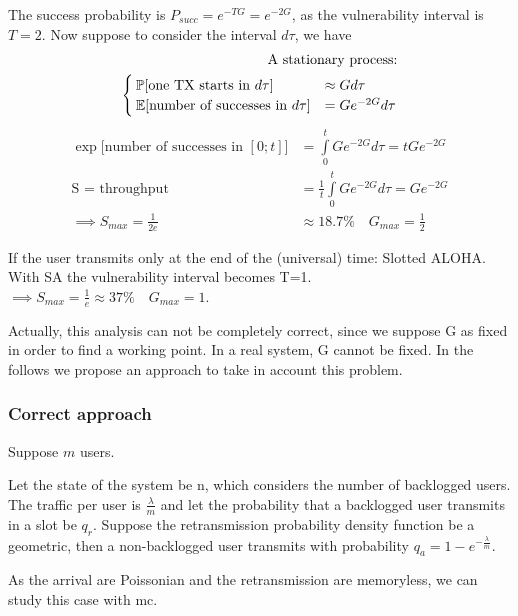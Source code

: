 The success probability is $P_{succ} = e^{-T G} = e^{-2 G}$, as the vulnerability interval is $T=2$.
Now suppose to consider the interval $d\tau$, we have
\begin{equation}\begin{split}
	\text{A stationary process:} \\
	\begin{cases}
		\mathbb{P}[\text{one TX starts in $d\tau$}] &\approx G d\tau\\
		\mathbb{E}[\text{number of successes in $d\tau$}] &= G e^{-2 G} d\tau \\
	\end{cases}
	\end{split}
	\end{equation}
	\begin{equation}\begin{split}
	\exp\bigg[\text{number of successes in $[0;t]$}\bigg] &= \int\limits_0^t G e^{-2 G}d\tau = t G e^{-2 G}\\
	\text{S = throughput }&=\frac{1}{t} \int\limits_0^t G e^{-2 G}d\tau = G e^{-2 G}\\
	\implies S_{max} = \frac{1}{2e}& \approx 18.7\% \quad G_{max} = \frac{1}{2}
\end{split}\end{equation}

If the user transmits only at the end of the (universal) time: Slotted ALOHA.
With SA the vulnerability interval becomes T=1. $\implies S_{max}=\frac{1}{e} \approx 37\% \quad G_{max} = 1$.

Actually, this analysis can not be completely correct, since we suppose G as fixed in order to find a working point. In a real system, G cannot be fixed. In the follows we propose an approach to take in account this problem.

\subsubsection{Correct approach}

Suppose $m$ users.

Let the state of the system be n, which considers the number of backlogged users.
The traffic per user is $\frac{\lambda}{m}$ and let the probability that a backlogged user transmits in a slot be $q_r$. Suppose the retransmission probability density function be a geometric, then a non-backlogged user transmits with probability $q_a = 1-e^{-\frac{\lambda}{m}}$.

As the arrival are Poissonian and the retransmission are memoryless, we can study this case with \gls{mc}.


